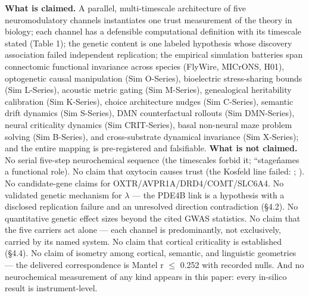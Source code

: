 \documentclass[
]{article}
\begin{document}
\textbf{What is claimed.} A parallel, multi-timescale architecture of
five neuromodulatory channels instantiates one trust measurement of the
theory in biology; each channel has a defensible computational
definition with its timescale stated (Table 1); the genetic content is
one labeled hypothesis whose discovery association failed independent
replication; the empirical simulation batteries span connectomic
functional invariance across species (FlyWire, MICrONS, H01),
optogenetic causal manipulation (Sim O-Series), bioelectric
stress-sharing bounds (Sim L-Series), acoustic metric gating (Sim
M-Series), genealogical heritability calibration (Sim K-Series), choice
architecture nudges (Sim C-Series), semantic drift dynamics (Sim
S-Series), DMN counterfactual rollouts (Sim DMN-Series), neural
criticality dynamics (Sim CRIT-Series), basal non-neural maze problem
solving (Sim B-Series), and cross-substrate dynamical invariance (Sim
X-Series); and the entire mapping is pre-registered and falsifiable.
\textbf{What is not claimed.} No serial five-step neurochemical sequence
(the timescales forbid it; ``stageń́ames a functional role). No claim
that oxytocin causes trust (the Kosfeld line failed: ; ). No
candidate-gene claims for OXTR/AVPR1A/DRD4/COMT/SLC6A4. No validated
genetic mechanism for \(\lambda\) --- the PDE4B link is a hypothesis
with a disclosed replication failure and an unresolved direction
contradiction (§4.2). No quantitative genetic effect sizes beyond the
cited GWAS statistics. No claim that the five carriers act alone ---
each channel is predominantly, not exclusively, carried by its named
system. No claim that cortical criticality is established (§4.4). No
claim of isometry among cortical, semantic, and linguistic geometries
--- the delivered correspondence is Mantel r \(\leq\) 0.252 with
recorded nulls. And no neurochemical measurement of any kind appears in
this paper: every in-silico result is instrument-level.
\end{document}
